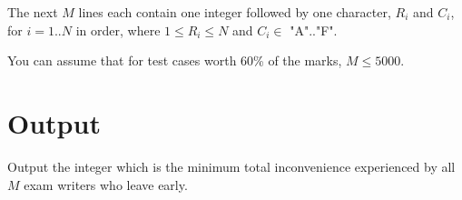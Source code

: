 The next $M$ lines each contain one integer followed by one character, $R_i$ and $C_i$, for $i = 1..N$ in order, where $1 \leq R_i \leq N$ and $C_i \in$ "A".."F".

You can assume that for test cases worth 60\% of the marks, $M \leq 5000$.

\section*{Output}

Output the integer which is the minimum total inconvenience experienced by all $M$ exam writers who leave early.